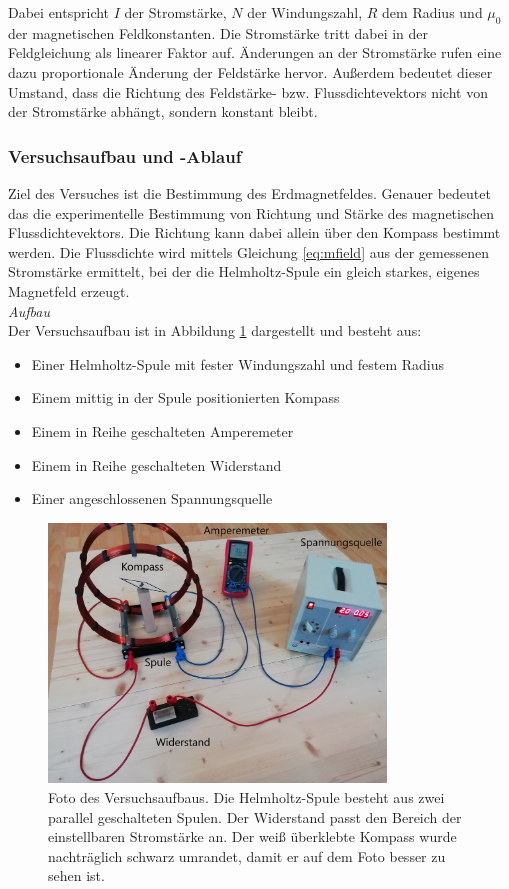 Dabei entspricht $I$ der Stromstärke, $N$ der Windungszahl, $R$ dem Radius und $\mu_{0}$ der magnetischen Feldkonstanten. Die Stromstärke tritt dabei in der Feldgleichung als linearer Faktor auf. Änderungen an der Stromstärke rufen eine dazu proportionale Änderung der Feldstärke hervor. Außerdem bedeutet dieser Umstand, dass die Richtung des Feldstärke- bzw. Flussdichtevektors nicht von der Stromstärke abhängt, sondern konstant bleibt.\\

\subsubsection{Versuchsaufbau und -Ablauf}
\label{sec-2-3-4}
Ziel des Versuches ist die Bestimmung des Erdmagnetfeldes. Genauer bedeutet das die experimentelle Bestimmung von Richtung und Stärke des magnetischen Flussdichtevektors. Die Richtung kann dabei allein über den Kompass bestimmt werden. Die Flussdichte wird mittels Gleichung \ref{eq:mfield} aus der gemessenen Stromstärke ermittelt, bei der die Helmholtz-Spule ein gleich starkes, eigenes Magnetfeld erzeugt.\\

\textit{Aufbau}\\
Der Versuchsaufbau ist in Abbildung \ref{img:experiment-devices} dargestellt und besteht aus: 
\begin{itemize}
	\setlength{\itemsep}{-5pt}
	\item Einer Helmholtz-Spule mit fester Windungszahl und festem Radius
	\item Einem mittig in der Spule positionierten Kompass
	\item Einem in Reihe geschalteten Amperemeter
	\item Einem in Reihe geschalteten Widerstand	
	\item Einer angeschlossenen Spannungsquelle
\end{itemize}

\begin{figure}[h!]
	\centering
	\includegraphics[width=0.8\textwidth]{images/papers/setup_labled.jpg}
	\caption{Foto des Versuchsaufbaus. Die Helmholtz-Spule besteht aus zwei parallel geschalteten Spulen. Der Widerstand passt den Bereich der einstellbaren Stromstärke an. Der weiß überklebte Kompass wurde nachträglich schwarz umrandet, damit er auf dem Foto besser zu sehen ist.}
	\label{img:experiment-devices}
\end{figure}

